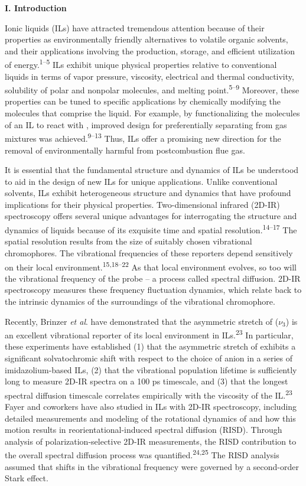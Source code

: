 \documentclass[]{article}
\begin{document}
\textbf{I. Introduction}

Ionic liquids (ILs) have attracted tremendous attention because of their properties as environmentally friendly alternatives to volatile organic solvents, and their applications involving the production, storage, and efficient utilization of energy.\textsuperscript{1--5} ILs exhibit unique physical properties relative to conventional liquids in terms of vapor pressure, viscosity, electrical and thermal conductivity, solubility of polar and nonpolar molecules, and melting point.\textsuperscript{5--9} Moreover, these properties can be tuned to specific applications by chemically modifying the molecules that comprise the liquid. For example, by functionalizing the molecules of an IL to react with , improved design for preferentially separating  from gas mixtures was achieved.\textsuperscript{9--13} Thus, ILs offer a promising new direction for the removal of environmentally harmful  from postcombustion flue gas.

It is essential that the fundamental structure and dynamics of ILs be understood to aid in the design of new ILs for unique applications.  Unlike conventional solvents, ILs exhibit heterogeneous structure and dynamics that have profound implications for their physical properties.  Two-dimensional infrared (2D-IR) spectroscopy offers several unique advantages for interrogating the structure and dynamics of liquids because of its exquisite time and spatial resolution.\textsuperscript{14--17} The spatial resolution results from the size of suitably chosen vibrational chromophores. The vibrational frequencies of these reporters depend sensitively on their local environment.\textsuperscript{15,18--22} As that local environment evolves, so too will the vibrational frequency of the probe -- a process called spectral diffusion. 2D-IR spectroscopy measures these frequency fluctuation dynamics, which relate back to the intrinsic dynamics of the surroundings of the vibrational chromophore.

Recently, Brinzer \emph{et al}. have demonstrated that the asymmetric stretch of  (\(\nu_3\)) is an excellent vibrational reporter of its local environment in ILs.\textsuperscript{23} In particular, these experiments have established (1) that the asymmetric stretch of  exhibits a significant solvatochromic shift with respect to the choice of anion in a series of imidazolium-based ILs, (2) that the  vibrational population lifetime is sufficiently long to measure 2D-IR spectra on a 100 ps timescale, and (3) that the longest spectral diffusion timescale correlates empirically with the viscosity of the IL.\textsuperscript{23} Fayer and coworkers have also studied  in ILs with 2D-IR spectroscopy, including detailed measurements and modeling of the rotational dynamics of  and how this motion results in reorientational-induced spectral diffusion (RISD). Through analysis of polarization-selective 2D-IR measurements, the RISD contribution to the overall spectral diffusion process was quantified.\textsuperscript{24,25} The RISD analysis assumed that shifts in the  vibrational frequency were governed by a second-order Stark effect.
\end{document}
